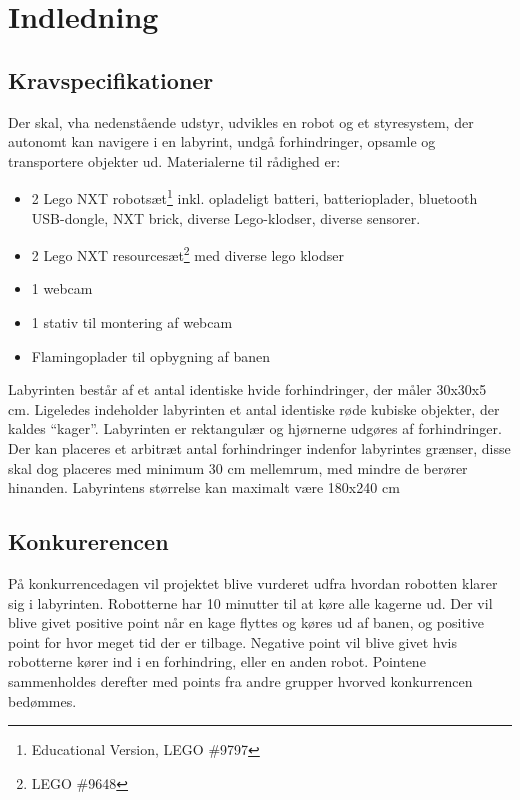 \chapter{Indledning}

\section{Kravspecifikationer}
Der skal, vha nedenstående udstyr, udvikles en robot og et styresystem, der autonomt kan navigere i en labyrint, undgå forhindringer, opsamle og transportere objekter ud.
Materialerne til rådighed er:
\begin{itemize}
\item 2 Lego NXT robotsæt\footnote{Educational Version, LEGO \#9797} inkl. opladeligt batteri, batterioplader, bluetooth USB-dongle, NXT brick, diverse Lego-klodser, diverse sensorer.
\item 2 Lego NXT resourcesæt\footnote{LEGO \#9648} med diverse lego klodser
\item 1 webcam
\item 1 stativ til montering af webcam
\item Flamingoplader til opbygning af banen
\end{itemize}

Labyrinten består af et antal identiske hvide forhindringer, der måler 30x30x5 cm. Ligeledes indeholder labyrinten et antal identiske røde kubiske objekter, der kaldes "`kager"'. Labyrinten er rektangulær og hjørnerne udgøres af forhindringer. Der kan placeres et arbitræt antal forhindringer indenfor labyrintes grænser, disse skal dog placeres med minimum 30 cm mellemrum, med mindre de berører hinanden. Labyrintens størrelse kan maximalt være 180x240 cm

\section{Konkurerencen}
På konkurrencedagen vil projektet blive vurderet udfra hvordan robotten klarer sig i labyrinten. Robotterne har 10 minutter til at køre alle kagerne ud. Der vil blive givet positive point når en kage flyttes og køres ud af banen, og positive point for hvor meget tid der er tilbage. Negative point vil blive givet hvis robotterne kører ind i en forhindring, eller en anden robot. Pointene sammenholdes derefter med points fra andre grupper hvorved konkurrencen bedømmes.